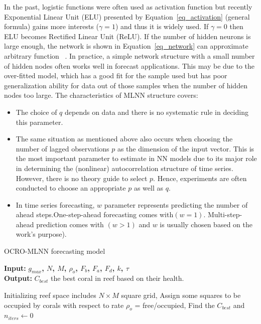 \documentclass[11pt,twoside]{article}
\begin{document}
\begin{multicols}{2}
In the past, logistic functions were often used as activation function but recently Exponential Linear Unit (ELU) presented by Equation~\ref{eq_activation} (general formula) gains more interests ($\gamma = 1$) and thus it is widely used. 
If $\gamma = 0$ then ELU becomes Rectified Linear Unit (ReLU).
If the number of hidden neurons is large enough, the network is shown in Equation~\ref{eq_network} can approximate arbitrary function ~\citep{ref_hornik}. In practice, a simple network structure with a small number of hidden nodes often works well in forecast applications. This may be due to the over-fitted model, which has a good fit for the sample used but has poor generalization ability for data out of those samples when the number of hidden nodes too large. The characteristics of MLNN structure covers:

\begin{itemize}
	\item The choice of $q$ depends on data and there is no systematic rule in deciding this parameter. 
	\item The same situation as mentioned above also occurs when choosing the number of lagged observations $p$ as the dimension of the input vector. This is the most important parameter to estimate in NN models due to its major role in determining the (nonlinear) autocorrelation structure of time series. However, there is no theory guide to select $p$. Hence, experiments are often conducted to choose an appropriate $p$ as well as $q$. 
	\item In time series forecasting, $w$ parameter represents predicting the number of ahead steps.One-step-ahead forecasting comes with$(w=1)$. Multi-step-ahead prediction comes with $(w>1)$ and $w$ is usually chosen based on the work's purpose).  
\end{itemize}


\begin{algorithm*}[!t]
	\caption{OCRO-MLNN forecasting model}\label{MLNN_OCRO}
	\hspace*{\algorithmicindent} \textbf{Input:} 
	\textbf{ $g_{max}$, $N$, $M$, $\rho_{o}$, $F_{b}$, $F_{a}$, $F_{d}$, $k$, $\tau$ }\\
	\hspace*{\algorithmicindent} \textbf{Output:} $C_{best}$ the best coral in reef based on their health.
	\begin{algorithmic}[1]
		\State Initializing reef space includes $N \times M$ square grid, 
		\Statex Assign some squares to be occupied by corals with respect to rate $\rho_{o}$ = free/occupied, 
		\Statex Find the $C_{best}$ and $n_{iters} \gets 0$


\end{algorithmic}
\end{algorithm*}
\end{multicols}
\end{document}
